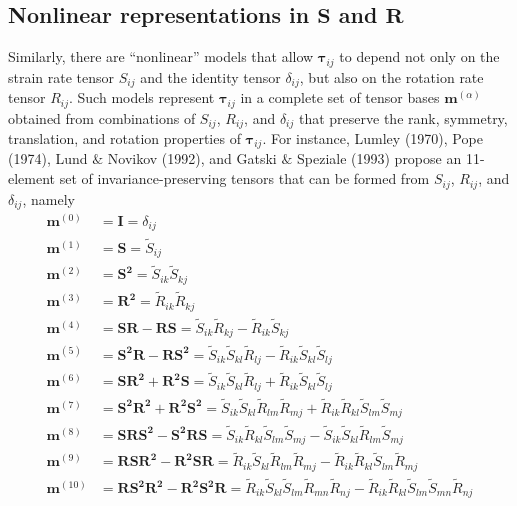 \subsection{Nonlinear representations in $\mathbf{S}$ and $\mathbf{R}$} 
\label{sec:1A2}

Similarly, there are ``nonlinear'' models that allow $\mathbf{\tau}_{ij}$  to depend not only on the strain rate tensor $S_{ij}$  and the identity tensor $\delta_{ij}$, but also on the rotation rate tensor $R_{ij}$. Such models represent  $\mathbf{\tau}_{ij}$  in a complete set of tensor bases  $\mathbf{m}^{(\alpha)}$ obtained from combinations of $S_{ij}$, $R_{ij}$, and $\delta_{ij}$  that preserve the rank, symmetry, translation, and rotation properties of $\mathbf{\tau}_{ij}$. For instance, Lumley (1970), Pope (1974), Lund $\&$ Novikov (1992), and Gatski $\&$ Speziale (1993) propose an 11-element set of invariance-preserving tensors   that can be formed from $S_{ij}$, $R_{ij}$, and $\delta_{ij}$, namely
%
\begin{subequations}
\label{E:22}
\begin{align}
 	\mathbf{m}^{(0)} &= \mathbf{I} = \delta_{ij} \\
	\mathbf{m}^{(1)} &= \mathbf{S} = \widetilde{S}_{ij} \\
	\mathbf{m}^{(2)} &= \mathbf{S^2} = \widetilde{S}_{ik} \widetilde{S}_{kj} \\
	\mathbf{m}^{(3)} &= \mathbf{R^2} = \widetilde{R}_{ik} \widetilde{R}_{kj} \\
	\mathbf{m}^{(4)} &= \mathbf{SR - RS} = \widetilde{S}_{ik} \widetilde{R}_{kj} 
	- \widetilde{R}_{ik} \widetilde{S}_{kj} \\
	\mathbf{m}^{(5)} &= \mathbf{S^2R - RS^2} 
	= 	\widetilde{S}_{ik} \widetilde{S}_{kl} \widetilde{R}_{lj} 
	-   \widetilde{R}_{ik} \widetilde{S}_{kl} \widetilde{S}_{lj} \\
	\mathbf{m}^{(6)} &= \mathbf{SR^2 + R^2S} 
	= 	\widetilde{S}_{ik} \widetilde{S}_{kl} \widetilde{R}_{lj} 
	+   \widetilde{R}_{ik} \widetilde{S}_{kl} \widetilde{S}_{lj} \\
	\mathbf{m}^{(7)} &= \mathbf{S^2R^2 + R^2S^2} 
	= 	\widetilde{S}_{ik} \widetilde{S}_{kl} \widetilde{R}_{lm} \widetilde{R}_{mj}  
	+   \widetilde{R}_{ik} \widetilde{R}_{kl} \widetilde{S}_{lm} \widetilde{S}_{mj} \\
	\mathbf{m}^{(8)} &= \mathbf{SRS^2 - S^2RS} 
	= 	\widetilde{S}_{ik} \widetilde{R}_{kl} \widetilde{S}_{lm} \widetilde{S}_{mj}  
	-   \widetilde{S}_{ik} \widetilde{S}_{kl} \widetilde{R}_{lm} \widetilde{S}_{mj} \\
	\mathbf{m}^{(9)} &= \mathbf{RSR^2 - R^2SR} 
	= 	\widetilde{R}_{ik} \widetilde{S}_{kl} \widetilde{R}_{lm} \widetilde{R}_{mj}  
	-   \widetilde{R}_{ik} \widetilde{R}_{kl} \widetilde{S}_{lm} \widetilde{R}_{mj} \\
	\mathbf{m}^{(10)} &= \mathbf{RS^2R^2 - R^2S^2R} 
	= 	\widetilde{R}_{ik} \widetilde{S}_{kl} \widetilde{S}_{lm} \widetilde{R}_{mn} \widetilde{R}_{nj} 
	-   \widetilde{R}_{ik} \widetilde{R}_{kl} \widetilde{S}_{lm} \widetilde{S}_{mn} \widetilde{R}_{nj}
\end{align}
\end{subequations}
